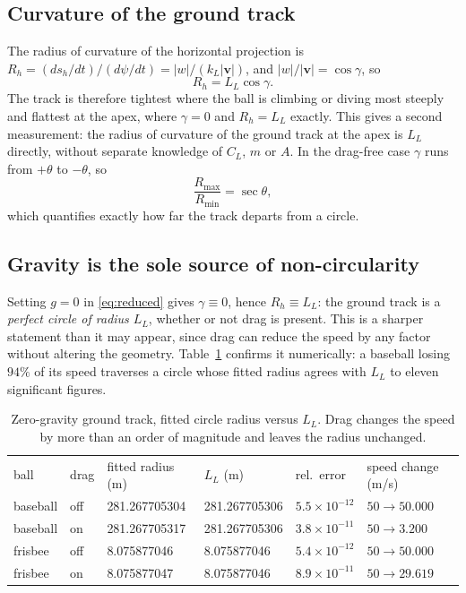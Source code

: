 \documentclass[aip,amsmath,amssymb,preprint,floatfix]{revtex4-2}
\newcommand{\kL}{k_{L}}
\newcommand{\LL}{L_{L}}
\newcommand{\vv}{\bm{v}}
\begin{document}
\subsection{Curvature of the ground track}

The radius of curvature of the horizontal projection is
$R_h=(ds_h/dt)/(d\psi/dt)=|w|/(\kL|\vv|)$, and $|w|/|\vv|=\cos\gamma$, so
\begin{equation}
R_h = \LL\cos\gamma .
\label{eq:curvature}
\end{equation}
The track is therefore tightest where the ball is climbing or diving most steeply
and flattest at the apex, where $\gamma=0$ and $R_h=\LL$ exactly. This gives a second
measurement: the radius of curvature of the ground track at the apex is $\LL$
directly, without separate knowledge of $C_L$, $m$ or $A$. In the drag-free case
$\gamma$ runs from $+\theta$ to $-\theta$, so
\begin{equation}
\frac{R_{\max}}{R_{\min}} = \sec\theta ,
\end{equation}
which quantifies exactly how far the track departs from a circle.

\subsection{Gravity is the sole source of non-circularity}

Setting $g=0$ in \eqref{eq:reduced} gives $\gamma\equiv0$, hence $R_h\equiv\LL$: the
ground track is a \emph{perfect circle of radius $\LL$}, whether or not drag is
present. This is a sharper statement than it may appear, since drag can reduce the
speed by any factor without altering the geometry. Table~\ref{tab:circle} confirms
it numerically: a baseball losing $94\%$ of its speed traverses a circle whose fitted
radius agrees with $\LL$ to eleven significant figures.

\begin{table}[t]
\caption{Zero-gravity ground track, fitted circle radius versus $\LL$. Drag changes
the speed by more than an order of magnitude and leaves the radius unchanged.}
\label{tab:circle}
\begin{ruledtabular}
\begin{tabular}{llllll}
ball & drag & fitted radius (m) & $\LL$ (m) & rel.\ error & speed change (m/s) \\
\colrule
baseball & off & 281.267705304 & 281.267705306 & $5.5\times10^{-12}$ & $50\to50.000$ \\
baseball & on  & 281.267705317 & 281.267705306 & $3.8\times10^{-11}$ & $50\to3.200$ \\
frisbee  & off & 8.075877046   & 8.075877046   & $5.4\times10^{-12}$ & $50\to50.000$ \\
frisbee  & on  & 8.075877047   & 8.075877046   & $8.9\times10^{-11}$ & $50\to29.619$ \\
\end{tabular}
\end{ruledtabular}
\end{table}
\end{document}
